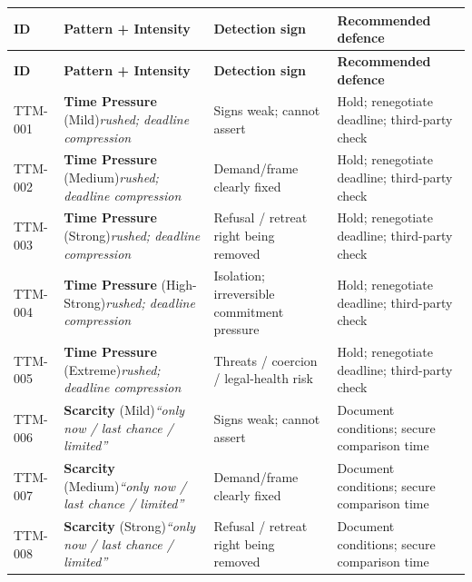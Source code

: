 \begin{small}
\begin{longtable}{@{}p{1.4cm}p{3.6cm}p{3.6cm}p{4.0cm}@{}}
\toprule
\textbf{ID} & \textbf{Pattern + Intensity} & \textbf{Detection sign} & \textbf{Recommended defence} \\
\midrule
\endfirsthead
\toprule
\textbf{ID} & \textbf{Pattern + Intensity} & \textbf{Detection sign} & \textbf{Recommended defence} \\
\midrule
\endhead
\bottomrule
\endfoot
TTM-001 & \textbf{Time Pressure} (Mild)\newline\textit{\footnotesize rushed; deadline compression} & Signs weak; cannot assert & Hold; renegotiate deadline; third-party check \\
\addlinespace[0.2em]
TTM-002 & \textbf{Time Pressure} (Medium)\newline\textit{\footnotesize rushed; deadline compression} & Demand/frame clearly fixed & Hold; renegotiate deadline; third-party check \\
\addlinespace[0.2em]
TTM-003 & \textbf{Time Pressure} (Strong)\newline\textit{\footnotesize rushed; deadline compression} & Refusal / retreat right being removed & Hold; renegotiate deadline; third-party check \\
\addlinespace[0.2em]
TTM-004 & \textbf{Time Pressure} (High-Strong)\newline\textit{\footnotesize rushed; deadline compression} & Isolation; irreversible commitment pressure & Hold; renegotiate deadline; third-party check \\
\addlinespace[0.2em]
TTM-005 & \textbf{Time Pressure} (Extreme)\newline\textit{\footnotesize rushed; deadline compression} & Threats / coercion / legal-health risk & Hold; renegotiate deadline; third-party check \\
\addlinespace[0.2em]
TTM-006 & \textbf{Scarcity} (Mild)\newline\textit{\footnotesize ``only now / last chance / limited''} & Signs weak; cannot assert & Document conditions; secure comparison time \\
\addlinespace[0.2em]
TTM-007 & \textbf{Scarcity} (Medium)\newline\textit{\footnotesize ``only now / last chance / limited''} & Demand/frame clearly fixed & Document conditions; secure comparison time \\
\addlinespace[0.2em]
TTM-008 & \textbf{Scarcity} (Strong)\newline\textit{\footnotesize ``only now / last chance / limited''} & Refusal / retreat right being removed & Document conditions; secure comparison time \\

\end{longtable}
\end{small}
